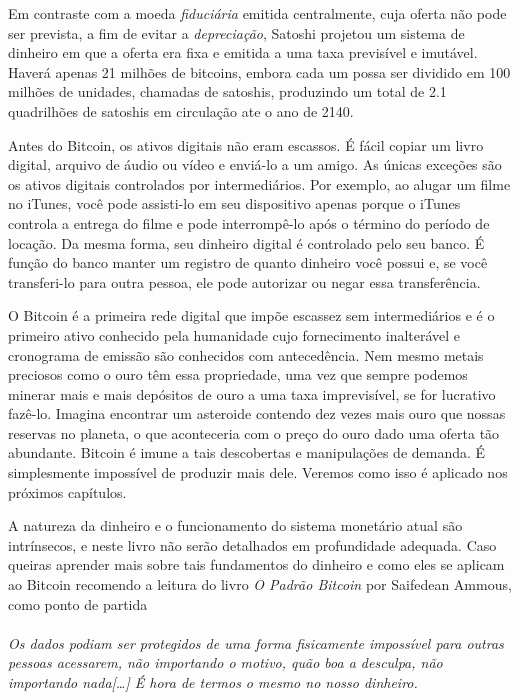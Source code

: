 Em contraste com a moeda \textit{fiduciária} emitida centralmente, cuja oferta não pode ser prevista, a fim de evitar a \textit{depreciação}, Satoshi projetou um sistema de dinheiro em que a oferta era fixa e emitida a uma taxa previsível e imutável. Haverá apenas 21 milhões de bitcoins, embora cada um possa ser dividido em 100 milhões de unidades, chamadas de satoshis, produzindo um total de 2.1 quadrilhões de satoshis em circulação ate o ano de 2140.

Antes do Bitcoin, os ativos digitais não eram escassos. É fácil copiar um livro digital, arquivo de áudio ou vídeo e enviá-lo a um amigo. As únicas exceções são os ativos digitais controlados por intermediários. Por exemplo, ao alugar um filme no iTunes, você pode assisti-lo em seu dispositivo apenas porque o iTunes controla a entrega do filme e pode interrompê-lo após o término do período de locação. Da mesma forma, seu dinheiro digital é controlado pelo seu banco. É função do banco manter um registro de quanto dinheiro você possui e, se você transferi-lo para outra pessoa, ele pode autorizar ou negar essa transferência.

O Bitcoin é a primeira rede digital que impõe escassez sem intermediários e é o primeiro ativo conhecido pela humanidade cujo fornecimento inalterável e cronograma de emissão são conhecidos com antecedência. Nem mesmo metais preciosos como o ouro têm essa propriedade, uma vez que sempre podemos minerar mais e mais depósitos de ouro a uma taxa imprevisível, se for lucrativo fazê-lo. 
Imagina encontrar um asteroide contendo dez vezes mais ouro que nossas reservas no planeta, o que aconteceria com o preço do ouro dado uma oferta tão abundante.
Bitcoin é imune a tais descobertas e manipulações de demanda. É simplesmente impossível de produzir mais dele.
Veremos como isso é aplicado nos próximos capítulos.

A natureza da dinheiro e o funcionamento do sistema monetário atual são intrínsecos, e neste livro não serão detalhados em profundidade adequada. Caso queiras aprender mais sobre tais fundamentos do dinheiro e como eles se aplicam ao Bitcoin recomendo a leitura do livro \textit{O Padrão Bitcoin} por Saifedean Ammous, como ponto de partida
\paragraph{}
\textit{Os dados podiam ser protegidos de uma forma fisicamente impossível para outras pessoas acessarem, não importando o motivo, quão boa a desculpa, não importando nada[\ldots] É hora de termos o mesmo no nosso dinheiro.}
